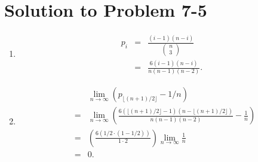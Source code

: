 \documentclass[a4paper, fleqn]{article}
\begin{document}
\section*{Solution to Problem 7-5}
\begin{enumerate}
\renewcommand{\labelenumi}{\itshape \bfseries \alph{enumi}.}

\item  %
\begin{eqnarray*}
p_i
& = & \frac{(i - 1)(n - i)}{\left(\!\begin{array}{c}n \\ 3\end{array}\!\right)} \\
& = & \frac{6(i - 1)(n - i)}{n(n - 1)(n - 2)}.
\end{eqnarray*}



\item  %
\begin{eqnarray*}
& & \lim_{n \rightarrow \infty} (p_{\lfloor (n + 1) / 2 \rfloor} - 1 / n) \\
& = & \lim_{n \rightarrow \infty} \left( \frac{6(\lfloor (n + 1) / 2 \rfloor - 1)(n - \lfloor (n + 1) / 2 \rfloor)}{n(n - 1)(n - 2)} - \frac{1}{n} \right) \\
& = & \left(\frac{6(1/2 \cdot (1 - 1/2))}{1 \cdot 2}\right)\lim_{n \rightarrow \infty} \frac{1}{n} \\
& = & 0.
\end{eqnarray*}




\end{enumerate}
\end{document}
